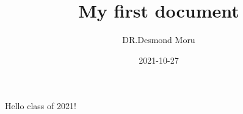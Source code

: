 \documentclass{article}
\title{My first document}
\date{2021-10-27}
\author{DR.Desmond Moru}
\begin{document}
	\maketitle
	\newpage
	Hello class of 2021!
\end{document}

